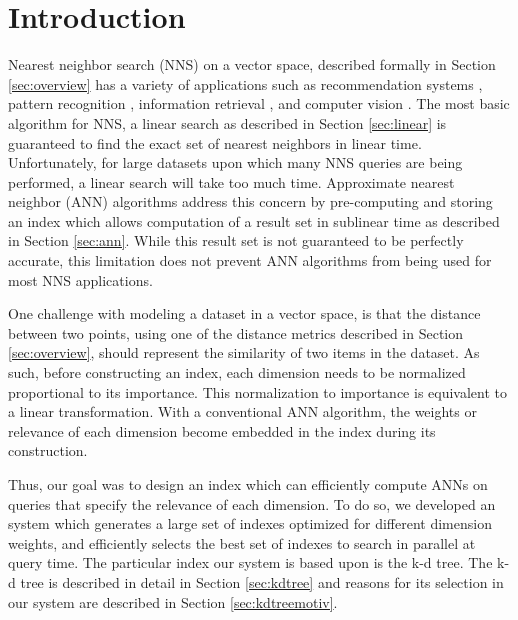 \chapter{Introduction} %

\label{futurework} %


Nearest neighbor search (NNS) on a vector space, described formally in Section \ref{sec:overview} has a variety of applications such as recommendation systems \citep{suchal2010full}, pattern recognition \citep{cover1967nearest}, information retrieval \citep{manning2008introduction}, and computer vision \citep{boiman2008defense}.  The most basic algorithm for NNS, a linear search as described in Section \ref{sec:linear} is guaranteed to find the exact set of nearest neighbors in linear time.  Unfortunately, for large datasets upon which many NNS queries are being performed, a linear search will take too much time.  Approximate nearest neighbor (ANN) algorithms address this concern by pre-computing and storing an index which allows computation of a result set in sublinear time as described in Section \ref{sec:ann}.  While this result set is not guaranteed to be perfectly accurate, this limitation does not prevent ANN algorithms from being used for most NNS applications.

One challenge with modeling a dataset in a vector space, is that the distance between two points, using one of the distance metrics described in Section \ref{sec:overview}, should represent the similarity of two items in the dataset.  As such, before constructing an index, each dimension needs to be normalized proportional to its importance.  This normalization to importance is equivalent to a linear transformation.  With a conventional ANN algorithm, the weights or relevance of each dimension become embedded in the index during its construction.

Thus, our goal was to design an index which can efficiently compute ANNs on queries that specify the relevance of each dimension.  To do so, we developed an system which generates a large set of indexes optimized for different dimension weights, and efficiently selects the best set of indexes to search in parallel at query time.  The particular index our system is based upon is the k-d tree.  The k-d tree is described in detail in Section \ref{sec:kdtree} and reasons for its selection in our system are described in Section \ref{sec:kdtreemotiv}.

